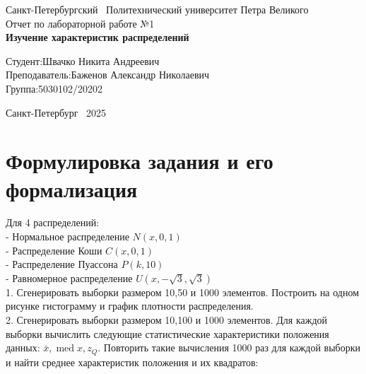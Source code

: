 \documentclass[a4paper]{article}
\begin{document}
    \begin{titlepage}
        \Large
        \begin{center}
            Санкт-Петербургский \ Политехнический университет Петра Великого\\
            \vspace{10em}Отчет по лабораторной работе №1\\
            \vspace{2em}
            \textbf{Изучение характеристик распределений}
        \end{center}
        \vspace{6em}
        \hfill\parbox{10cm}{
            \hspace*{2cm}\hspace*{-4cm}Студент:\hfill Швачко Никита Андреевич\\
            \hspace*{2cm}\hspace*{-4cm}Преподаватель:\hfill Баженов Александр Николаевич\\
            \hspace*{2cm}\hspace*{-4cm}Группа:\hfill 5030102/20202
        }
        \vspace{\fill}
        \begin{center}
            Санкт-Петербург \ 2025
        \end{center}
    \end{titlepage}


    \section{Формулировка задания и его формализация}\label{sec:----2}
    Для 4 распределений:
    \\- Нормальное распределение $N(x, 0,1)$
    \\- Распределение Коши $C(x, 0,1)$
    \\- Распределение Пуассона $P(k, 10)$
    \\- Равномерное распределение $U(x,-\sqrt{3}, \sqrt{3})$
    \\1. Сгенерировать выборки размером 10,50 и 1000 элементов. Построить на одном рисунке гистограмму и график плотности распределения.
    \\2. Сгенерировать выборки размером 10,100 и 1000 элементов. Для каждой выборки вычислить следующие статистические характеристики положения данных: $\bar{x}, \operatorname{med} x, z_Q$. Повторить такие вычисления 1000 раз для каждой выборки и найти среднее характеристик положения и их квадратов:
\end{document}

